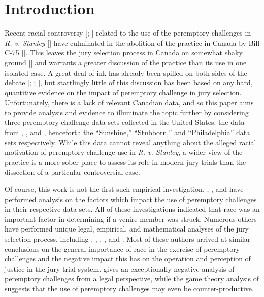 \section{Introduction} \label{c:introduction}

Recent racial controversy [\cite{fiverejected}; \cite{fraughthistory}]
related to the use of the peremptory challenges in
\textit{R. v. Stanley} [\cite{GeraldStanleyVerdict}] have culminated
in the abolition of the practice in Canada by Bill C-75 [\cite{billc75}]. This leaves the jury selection process in Canada on somewhat shaky ground [\cite{trialsrisk}] and warrants a greater discussion of the practice than its use in one isolated case. A great deal of ink has
already been spilled on both sides of the debate [\cite{peremparegood}; \cite{bothwrong}; \cite{goodfirststep}], but startlingly
little of this discussion has been based on any hard, quantitive evidence on the impact of peremptory challenge in jury
selection. Unfortunately, there is a lack of relevant Canadian data, and so this paper aims to provide analysis and evidence to illuminate the topic further by considering three peremptory
challenge data sets collected in the United States: the data from \cite{JurySunshineProj}, \cite{StubbornLegacy}, and
\cite{PerempChalMurder}, henceforth the ``Sunshine,'' ``Stubborn,'' and ``Philadelphia'' data sets respectively. While this data cannot reveal anything about the alleged racial motivation of peremptory challenge use in
\textit{R. v. Stanley}, a wider view of the practice is a more sober
place to assess its role in modern jury trials than the dissection of a particular controversial case.

Of course, this work is not the first such empirical investigation. \cite{JurySunshineProj}, \cite{StubbornLegacy}, and
\cite{PerempChalMurder} have performed analysis on the factors which
impact the use of peremptory challenges in their respective data
sets. All of these
investigations indicated that race was an important factor in
determining if a venire member was struck. Numerous others have
performed unique legal, empirical, and mathematical analyses of the jury
selection process, including
\cite{hoffman1997}, \cite{vandykejurysel}, \cite{hansvidjudging}, \cite{brown1978}, and \cite{ford2010}. Most of these authors arrived at similar conclusions on the general importance of race in the exercise of peremptory challenges
and the negative impact this has on the operation and perception of justice in the jury trial system. \cite{hoffman1997} gives an
exceptionally negative analysis of peremptory challenges from a legal perspective, while the game theory analysis of
\cite{ford2010} suggests that the use of peremptory challenges may even be counter-productive.


